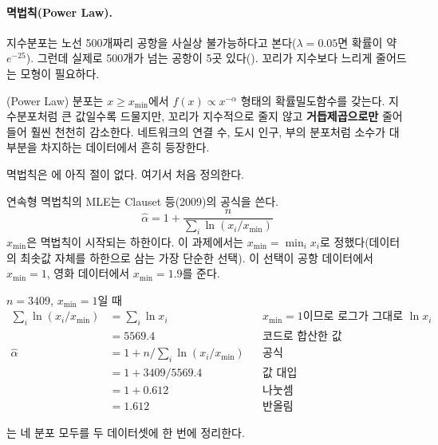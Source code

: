 \paragraph{멱법칙(Power Law).}
지수분포는 노선 500개짜리 공항을 사실상 불가능하다고 본다($\lambda=0.05$면 확률이
약 $e^{-25}$). 그런데 실제로 500개가 넘는 공항이 5곳 있다().
꼬리가 지수보다 느리게 줄어드는 모형이 필요하다.

(Power Law) 분포는 $x \geq x_{\min}$에서 $f(x) \propto x^{-\alpha}$
형태의 확률밀도함수를 갖는다. 지수분포처럼 큰 값일수록 드물지만, 꼬리가 지수적으로
줄지 않고 \textbf{거듭제곱으로만} 줄어들어 훨씬 천천히 감소한다. 네트워크의 연결 수,
도시 인구, 부의 분포처럼 소수가 대부분을 차지하는 데이터에서 흔히 등장한다.

\begin{pitfall}[책에 없는 분포]
멱법칙은 에 아직 절이 없다. 여기서 처음 정의한다.
\end{pitfall}

연속형 멱법칙의 MLE는 Clauset 등(2009)의 공식을 쓴다.
\[
  \hat\alpha = 1 + \frac{n}{\sum_{i} \ln(x_i / x_{\min})}
\]
$x_{\min}$은 멱법칙이 시작되는 하한이다. 이 과제에서는 $x_{\min} = \min_i x_i$로
정했다(데이터의 최솟값 자체를 하한으로 삼는 가장 단순한 선택). 이 선택이 공항
데이터에서 $x_{\min}=1$, 영화 데이터에서 $x_{\min}=1.9$를 준다.

\begin{example}
\label{ex:hw2-powerlaw-mle}
$n = 3409$, $x_{\min} = 1$일 때
\begin{align*}
  \sum_i \ln(x_i/x_{\min}) &= \sum_i \ln x_i    && x_{\min}=1\text{이므로 로그가 그대로 } \ln x_i \\
                            &= 5569.4            && \text{코드로 합산한 값}\\
  \hat\alpha &= 1 + n/\sum_i \ln(x_i/x_{\min})   && \text{공식}\\
             &= 1 + 3409/5569.4                  && \text{값 대입}\\
             &= 1 + 0.612                        && \text{나눗셈}\\
             &= 1.612                            && \text{반올림}
\end{align*}
\end{example}

는 네 분포 모두를 두 데이터셋에 한 번에 정리한다.

